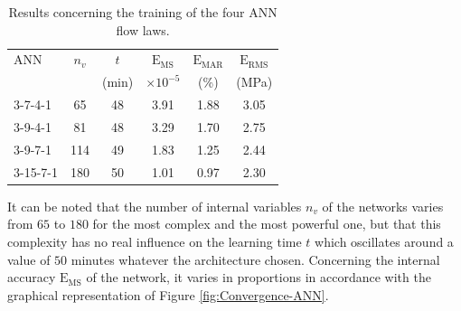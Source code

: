 \documentclass[algorithms,article,submit,pdftex,moreauthors]{Definitions/mdpi}
\DeclareRobustCommand{\MSE}{\text{E}_\text{MS}}
\DeclareRobustCommand{\RMSE}{\text{E}_\text{RMS}}
\DeclareRobustCommand{\MARE}{\text{E}_\text{MAR}}
\begin{document}
\begin{table}[h!]
\centering
\caption{Results concerning the training of the four ANN flow laws.}
\begin{tabular}{lccccc}
	\hline
	ANN    & $n_v$ &  $t$  &    $\MSE$    & $\MARE$ & $\RMSE$ \\
	         &     & (min) & $\times 10^{-5}$ &  (\%)   &  (MPa)  \\ \hline
	3-7-4-1  & 65  &  48   &       3.91       &  1.88   &  3.05   \\
	3-9-4-1  & 81  &  48   &       3.29       &  1.70   &  2.75   \\
	3-9-7-1  & 114 &  49   &       1.83       &  1.25   &  2.44   \\
	3-15-7-1 & 180 &  50   &       1.01       &  0.97   &  2.30\\ \hline
\end{tabular}
\label{tab:ErrorANN}
\end{table}
It can be noted that the number of internal variables $n_v$ of the networks varies from $65$ to $180$ for the most complex and the most powerful one, but that this complexity has no real influence on the learning time $t$ which oscillates around a value of $50$ minutes whatever the architecture chosen.
Concerning the internal accuracy $\MSE$ of the network, it varies in proportions in accordance with the graphical representation of Figure \ref{fig:Convergence-ANN}.
\end{document}
